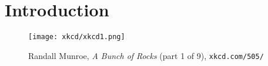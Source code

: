 \chapter*{Introduction}

\begin{figure}[h]
    \captionsetup{labelformat=empty}
     \texttt{[image: xkcd/xkcd1.png]}
    \caption*{  Randall Munroe, \emph{A Bunch of Rocks} (part 1 of 9), \texttt{xkcd.com/505/} }
\end{figure}






